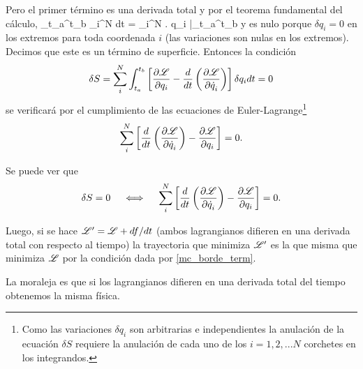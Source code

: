 \documentclass[10pt,oneside]{CBFT_book}
\begin{document}
Pero el primer término es una derivada total y por el teorema fundamental del cálculo,
\be
	\int_{t_a}^{t_b} \sum_i^N  dt =
	\sum_i^N \left.  \delta q_i \: \right|_{t_a}^{t_b}
\label{mc_borde_term}
\ee
y es nulo porque $\delta q_i=0$ en los extremos para toda coordenada $i$ (las variaciones son nulas en los extremos). 
Decimos que este es un término de superficie. Entonces la condición 
\[
	\delta S =  \sum_i^N  \int_{t_a}^{t_b}
	\left[ \frac{\partial^{\hspace{-0.05em}} {\mathscr{L}}}{\partial {q_i}^{\hspace{-0.05em}}} - \frac{d}{dt}\left( \frac{\partial^{\hspace{-0.05em}} {\mathscr{L}}}{\partial {\dot{q}_i}^{\hspace{-0.05em}}} \right)  \right]  \delta q_i  dt = 0
\]
se verificará por el cumplimiento de las ecuaciones de Euler-Lagrange\footnote{Como las variaciones $\delta q_i$ son 
arbitrarias e independientes la anulación de la ecuación $ \delta S $ requiere la anulación de cada uno de los 
$i=1,2,...N $ corchetes en los integrandos.}
\[
	\sum_i^N  \left[ \frac{d}{dt}\left( \frac{\partial^{\hspace{-0.05em}} {\mathscr{L}}}{\partial {\dot{q}_i}^{\hspace{-0.05em}}} \right) - \frac{\partial^{\hspace{-0.05em}} {\mathscr{L}}}{\partial {q_i}^{\hspace{-0.05em}}} \right] = 0.
\]

Se puede ver que 
\[
	\delta S = 0 \quad \iff \quad \sum_i^N  \left[ \frac{d}{dt}\left( \frac{\partial^{\hspace{-0.05em}} {\mathscr{L}}}{\partial {\dot{q}_i}^{\hspace{-0.05em}}} \right) -
	\frac{\partial^{\hspace{-0.05em}} {\mathscr{L}}}{\partial {q_i}^{\hspace{-0.05em}}} \right] = 0.
\]


Luego, si se hace $\mathscr{L}' = \mathscr{L} + df/dt$ (ambos lagrangianos difieren en una derivada total con 
respecto al tiempo) la trayectoria que minimiza $\mathscr{L}'$ es la que misma que minimiza
$\mathscr{L}$ por la condición dada por \eqref{mc_borde_term}. 

La moraleja es que si los lagrangianos difieren en una derivada total del tiempo obtenemos la misma
física.
\end{document}
